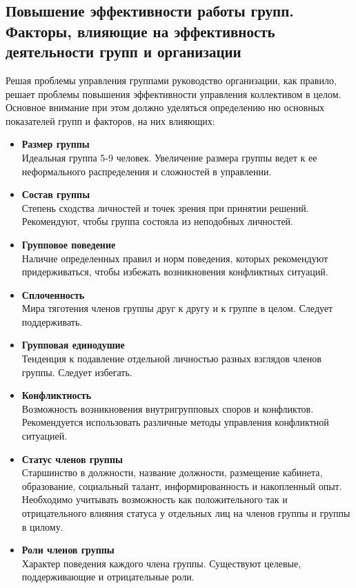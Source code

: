 \documentclass[a4paper,12pt,oneside,final]{extarticle}
\numberwithin{equation}{section}
\begin{document}
\subsection{Повышение эффективности работы групп. Факторы, влияющие на эффективность деятельности групп и организации}
Решая проблемы управления группами руководство организации, как правило, решает проблемы повышения эффективности управления коллективом в целом. 
Основное внимание при этом должно уделяться определению ню основных показателей групп и факторов, на них влияющих:
\begin{itemize}
	\item \textbf{Размер группы} \\
	Идеальная группа 5-9 человек. 
	Увеличение размера группы ведет к ее неформального распределения и сложностей в управлении.
	\item \textbf{Состав группы} \\
	Степень сходства личностей и точек зрения при принятии решений. 
	Рекомендуют, чтобы группа состояла из неподобных личностей.
	\item \textbf{Групповое поведение} \\
	Наличие определенных правил и норм поведения, которых рекомендуют придерживаться, чтобы избежать возникновения конфликтных ситуаций.
	\item \textbf{Сплоченность} \\
	Мира тяготения членов группы друг к другу и к группе в целом. 
	Следует поддерживать.
	\item \textbf{Групповая единодушие} \\
	Тенденция к подавление отдельной личностью разных взглядов членов группы. 
	Следует избегать.
	\item \textbf{Конфликтность} \\
	Возможность возникновения внутригрупповых споров и конфликтов. 
	Рекомендуется использовать различные методы управления конфликтной ситуацией.
	\item \textbf{Статус членов группы} \\
	Старшинство в должности, название должности, размещение кабинета, образование, социальный талант, информированность и накопленный опыт. 
	Необходимо учитывать возможность как положительного так и отрицательного влияния статуса у отдельных лиц на членов группы и группы в цилому.
	\item \textbf{Роли членов группы} \\
	Характер поведения каждого члена группы.
	Существуют целевые, поддерживающие и отрицательные роли.
\end{itemize}
\end{document}
